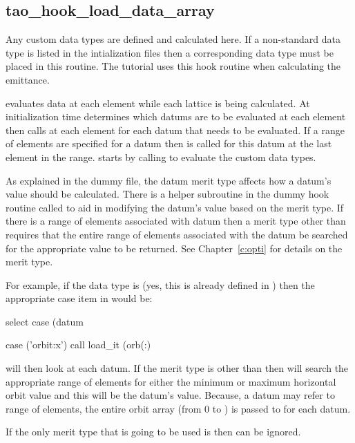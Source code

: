 \subsection{tao\_hook\_load\_data\_array}

Any custom data types are defined and calculated here. If a non-standard data
type is listed in the intialization files then a corresponding data type must
be placed in this routine. The tutorial uses this hook routine when
calculating the emittance. 

\tao evaluates data at each element while each lattice is being calculated. At
initialization time \tao determines which datums are to be evaluated at each
element then calls  at each element for each datum that
needs to be evaluated. If a range of elements are specified for a datum then
 is called for this datum at the last element in the
range.  starts by calling 
to evaluate the custom data types. 

As explained in the dummy file, the datum merit type
affects how a datum's value should be calculated. There is a helper subroutine
in the dummy hook routine called  to aid in modifying the datum's value based on the
merit type. If there is a range of elements associated with datum then a merit
type other than  requires that the entire range of elements
associated with the datum be searched for the appropriate value to be returned.
See Chapter~\ref{c:opti} for details on the merit type. 

For example, if the data type is  (yes, this is already defined in
\tao) then the appropriate case item in  would be:
\begin{example}
select case (datum%

case ('orbit:x')
  call load_it (orb(:)%
\end{example}
 will then look at each datum. If the merit type is other than
 then  will search the appropriate range of elements for
either the minimum or maximum horizontal orbit value and this will be the
datum's value. Because, a datum may refer to range of elements, the entire orbit
array (from 0 to ) is passed to  for each  datum.

If the only merit type that is going to be used is  then 
can be ignored.

